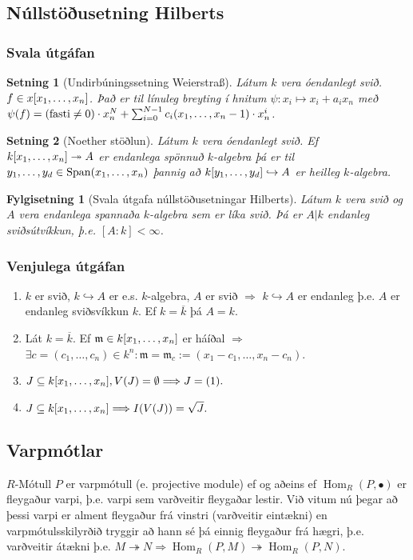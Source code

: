 \documentclass[a4paper, 14pt]{article}
\DeclareMathOperator{\Hom}{Hom}
\DeclareMathOperator{\Span}{Span}
\newtheorem{theorem}{Setning}
\newtheorem{corollary}{Fylgisetning}
\let\surfun\twoheadrightarrow
\let\infun\hookrightarrow
\newcommand{\then}{\Longrightarrow}
\newcommand{\ergo}{$\Longrightarrow$}
\newcommand{\m}{\mathfrak{m}}
\begin{document}
\subsection{Núllstöðusetning Hilberts}

\subsubsection{Svala útgáfan}
\begin{theorem}[Undirbúningssetning Weierstraß]
Látum $k$ vera óendanlegt svið. $f \in x[\xs]$. Það er til línuleg breyting í hnitum 
$\psi: x_i \mapsto x_i + a_ix_n$ með $\psi(f) = (\text{fasti} \neq 0) \cdot x_n^N + \sum_{i=0}^{N-1} c_i (\xs[x][n-1])
\cdot x_n^i$.
\end{theorem}

\begin{theorem}[Noether stöðlun]
Látum $k$ vera óendanlegt svið. Ef $k[\xs] \surfun A$ er endanlega spönnuð $k$-algebra þá er til $\xs[y][d]
\in \Span(\xs)$ þannig að $k[{\xs[y][d]}] \infun A$ er heilleg $k$-algebra.
\end{theorem}

\begin{corollary}[Svala útgafa núllstöðusetningar Hilberts]
Látum $k$ vera svið og $A$ vera endanlega spannaða $k$-algebra sem er líka svið. Þá er $A|k$ endanleg sviðsútvíkkun, 
þ.e. $[A : k] < \infty$.
\end{corollary}

\subsubsection{Venjulega útgáfan}
\begin{enumerate}
\item $k$ er svið, $k \hookrightarrow A$ er e.s. $k$-algebra, $A$ er svið $\then$ $k \hookrightarrow A$ er endanleg
þ.e. $A$ er endanleg sviðsvíkkun $k$. Ef $k = \overline{k}$ þá $A = k$.
\item Lát $k = \overline{k}.$ Ef $\m \in k[\xs]$ er háíðal \ergo $\exists c = (c_1, 
\dots, c_n) \in k^n: \m = \m_c := (x_1 - c_1, \dots, x_n - c_n)$.
\item $J \subseteq k[\xs], V(J) = \emptyset\then J = (1).$
\item $J \subseteq k[\xs] \then I(V(J)) = \sqrt{J}.$
\end{enumerate}

\subsection{Varpmótlar}
$R$-Mótull $P$ er varpmótull (e. projective module) ef og aðeins ef $\Hom_R(P, \bullet)$ er fleygaður varpi,
þ.e. varpi sem varðveitir fleygaðar lestir. Við vitum nú þegar að þessi varpi er alment fleygaður frá vinstri
(varðveitir eintækni) en varpmótulsskilyrðið tryggir að hann sé þá einnig fleygaður frá hægri,
þ.e. varðveitir átækni þ.e. $M \twoheadrightarrow N \then \Hom_R(P, M) \twoheadrightarrow \Hom_R(P,N).$ 
\end{document}
